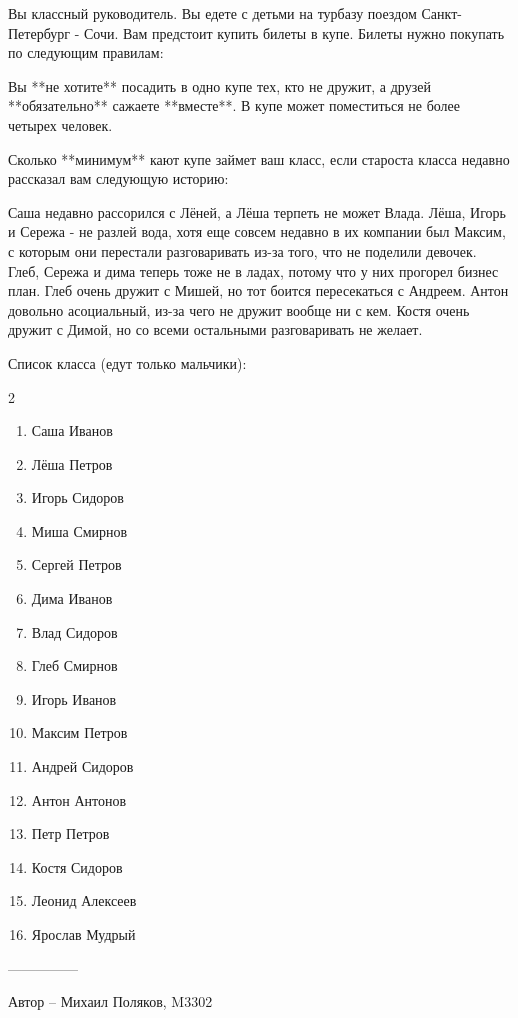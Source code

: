 \question
Вы классный руководитель. Вы едете с детьми на турбазу поездом Санкт-Петербург - Сочи. Вам предстоит купить билеты в купе. Билеты нужно покупать по следующим правилам:

Вы **не хотите** посадить в одно купе тех, кто не дружит, а друзей **обязательно** сажаете **вместе**. В купе может поместиться не более четырех человек.

Сколько **минимум** кают купе займет ваш класс, если староста класса недавно рассказал вам следующую историю:

Саша недавно рассорился с Лёней, а Лёша терпеть не может Влада. Лёша, Игорь и Сережа - не разлей вода, хотя еще совсем недавно в их компании был Максим, с которым они перестали разговаривать из-за того, что не поделили девочек. Глеб, Сережа и дима теперь тоже не в ладах, потому что у них прогорел бизнес план. Глеб очень дружит с Мишей, но тот боится пересекаться с Андреем. Антон довольно асоциальный, из-за чего не дружит вообще ни с кем. Костя очень дружит с Димой, но со всеми остальными разговаривать не желает.

Список класса (едут только мальчики):

\begin{multicols}{2}
\begin{enumerate}
\item Саша Иванов
\item Лёша Петров
\item Игорь Сидоров
\item Миша Смирнов
\item Сергей Петров
\item Дима Иванов
\item Влад Сидоров
\item Глеб Смирнов
\item Игорь Иванов
\item Максим Петров
\item Андрей Сидоров
\item Антон Антонов
\item Петр Петров
\item Костя Сидоров
\item Леонид Алексеев
\item Ярослав Мудрый
\end{enumerate}
\end{multicols}

---------------

Автор -- Михаил Поляков, M3302
